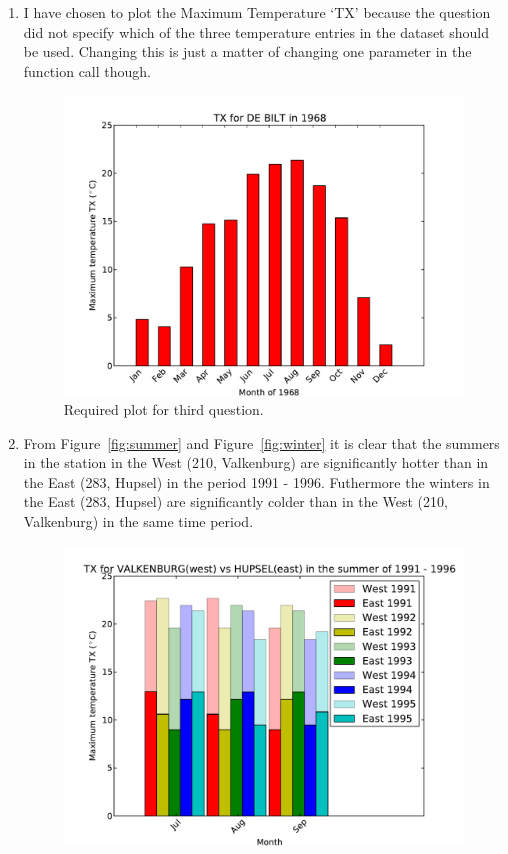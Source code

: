 \documentclass[a4paper]{article}
\begin{document}
\begin{enumerate}
\item
I have chosen to plot the Maximum Temperature `TX' because the question did not specify which of the three temperature entries in the dataset should be used. Changing this is just a matter of changing one parameter in the function call though.
\begin{figure}[h!] 
\begin{center} 
\includegraphics[scale=0.5]{../Week3/BLAC_hw5_TLRH_6126561_260_TX_1968.pdf} 
\caption{Required plot for third question.}
\end{center} 
\end{figure} 
\newpage
\item
From Figure~\ref{fig:summer} and Figure~\ref{fig:winter} it is clear that the summers in the station in the West (210, Valkenburg) are significantly hotter than in the East (283, Hupsel) in the period 1991 - 1996. Futhermore the winters in the East (283, Hupsel) are significantly colder than in the West (210, Valkenburg) in the same time period.
\begin{figure}[h!] 
\begin{center} 
\includegraphics[scale=0.5]{../Week3/BLAC_hw5_TLRH_6126561_210vs283_TX_summer_1991.pdf} 

\end{center}
\end{figure}
\end{enumerate}
\end{document}
